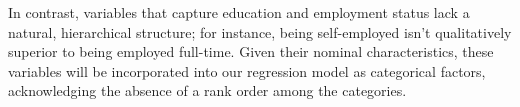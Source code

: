 \documentclass[
]{article}
\newenvironment{Shaded}{\begin{snugshade}}{\end{snugshade}}
\newcommand{\AttributeTok}[1]{\textcolor[rgb]{0.13,0.29,0.53}{#1}}
\newcommand{\DocumentationTok}[1]{\textcolor[rgb]{0.56,0.35,0.01}{\textbf{\textit{#1}}}}
\newcommand{\FunctionTok}[1]{\textcolor[rgb]{0.13,0.29,0.53}{\textbf{#1}}}
\newcommand{\NormalTok}[1]{#1}
\newcommand{\OtherTok}[1]{\textcolor[rgb]{0.56,0.35,0.01}{#1}}
\newcommand{\SpecialCharTok}[1]{\textcolor[rgb]{0.81,0.36,0.00}{\textbf{#1}}}
\begin{document}
In contrast, variables that capture education and employment status lack
a natural, hierarchical structure; for instance, being self-employed
isn't qualitatively superior to being employed full-time. Given their
nominal characteristics, these variables will be incorporated into our
regression model as categorical factors, acknowledging the absence of a
rank order among the categories.

\begin{Shaded}
\end{Shaded}
\end{document}
